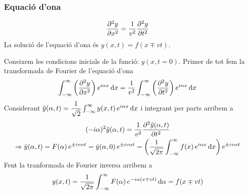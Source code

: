 \subsubsection*{Equació d'ona}
\begin{defi}
    \begin{align}
        \pder[2]{y}{x} = \frac{1}{v^{2}} \pder[2]{y}{t}
    \end{align}
    La solució de l'equació d'ona és $y(x,t) = f(x \mp vt)$.
\end{defi}
\begin{sproof}
    Coneixem les condicions inicials de la funció: $y(x, t=0)$. Primer de tot fem la transformada de Fourier de l'equació d'ona
    \begin{align*}
    \begin{aligned}
        \int_{-\infty}^{\infty} \lrpar{\pder[2]{y}{x}} e^{i\alpha x} \diff x = \frac{1}{v^{2}} \int_{-\infty}^{\infty} \lrpar{\pder[2]{y}{t}} e^{i\alpha x} \diff x
    \end{aligned}
    \end{align*}
    Considerant $\hat{y}(\alpha , t) = \dfrac{1}{\sqrt{2}} \int_{-\infty}^{\infty} y(x,t)\,e^{i\alpha x} \diff x$ i integrant per parts arribem a
    \begin{align*}
    \begin{gathered}
        (-i \alpha)^{2} \hat{y}(\alpha, t) = \frac{1}{v^{2}} \pder[2]{\hat{y}(\alpha, t)}{t} \\
        \Rightarrow \hat{y}(\alpha, t) = F(\alpha)\,e^{\pm iv\alpha t} = \hat{y}(\alpha, 0)\,e^{\pm iv\alpha t} = \lrpar{\frac{1}{\sqrt{2\pi}} \int_{-\infty}^{\infty} f(x)\,e^{i\alpha x} \diff x} e^{\pm iv \alpha t}
    \end{gathered}
    \end{align*}
    Fent la tranformada de Fourier inversa arribem a 
    \begin{align*}
        y(x,t) = \frac{1}{\sqrt{2\pi}}\int_{-\infty}^{\infty} F(\alpha)\,e^{-i \alpha (x \mp vt)} \diff \alpha = f(x \mp vt)
    \end{align*}
\end{sproof}

